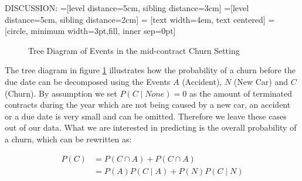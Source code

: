 \documentclass[12pt,titlepage]{article}
\begin{document}
DISCUSSION:
=[level distance=5cm, sibling distance=3cm]
=[level distance=5cm, sibling distance=2cm]
 = [text width=4em, text centered]
 = [circle, minimum width=3pt,fill, inner sep=0pt]
\noindent
\begin{figure}
\caption{Tree Diagram of Events in the mid-contract Churn Setting}
\label{fig:tree_diag}
\end{figure}
\noindent
The tree diagram in figure \ref{fig:tree_diag} illustrates how the probability of a churn before the due date can be decomposed using the Events $A$ (Accident), $N$ (New Car) and $C$ (Churn). By assumption we set $P(C\mid None) = 0$ as the amount of terminated contracts during the year which are not being
caused by a new car, an accident or a due date is very small and can be omitted. Therefore we leave these cases out of our data. What we are interested in predicting is the overall probability of a churn, which can be rewritten as:
\noindent
\begin{center}
\begin{equation} \label{prob_decomb}
    \begin{aligned}
        P(C) & = P(C\cap A) + P(C\cap A) \\
        & = P(A)P(C\mid A) + P(N)P(C\mid N) \\
    \end{aligned}
\end{equation}
\end{center}
\end{document}
